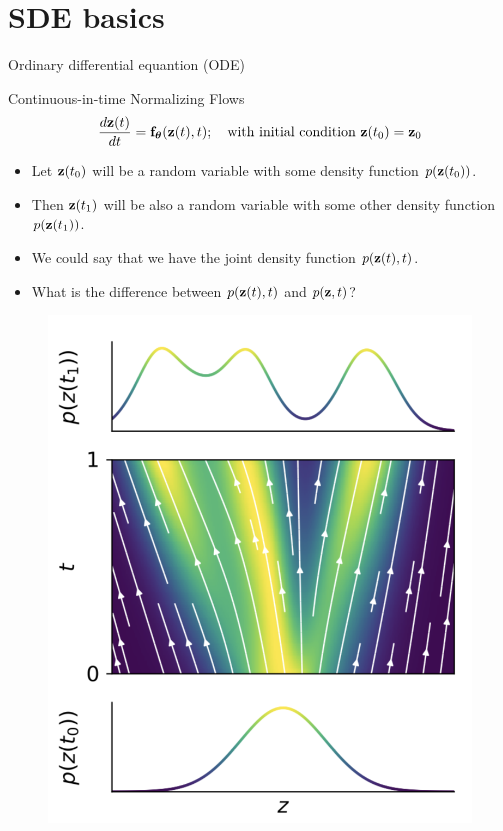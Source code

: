 \section{SDE basics}
\begin{frame}{Ordinary differential equantion (ODE)}
	\begin{block}{Continuous-in-time Normalizing Flows}
		\vspace{-0.3cm}
		\[
  			\frac{d \mathbf{z}(t)}{dt} = \mathbf{f}_{\boldsymbol{\theta}}(\mathbf{z}(t), t); \quad \text{with initial condition }\mathbf{z}(t_0) = \mathbf{z}_0
		\]
		\vspace{-0.5cm}
	\end{block}
	\begin{minipage}[t]{0.6\columnwidth}
		\begin{itemize}
			\item Let $\mathbf{z}(t_0)$ will be a random variable with some density function $p(\mathbf{z}(t_0))$.
		 	\item Then $\mathbf{z}(t_1)$ will be also a random variable with some other density function $p(\mathbf{z}(t_1))$.
			\item We could say that we have the joint density function $p(\mathbf{z}(t), t)$.
			\item What is the difference between $p(\mathbf{z}(t), t)$ and $p(\mathbf{z}, t)$?
		\end{itemize}
	\end{minipage}%
	\begin{minipage}[t]{0.4\columnwidth}	
		\begin{figure}
			\centering
			\includegraphics[width=\linewidth]{figs/cnf_flow.png}
		\end{figure}
	\end{minipage}
\end{frame}
